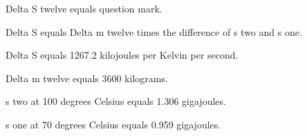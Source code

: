 Delta S twelve equals question mark.

Delta S equals Delta m twelve times the difference of s two and s one.

Delta S equals 1267.2 kilojoules per Kelvin per second.

Delta m twelve equals 3600 kilograms.

s two at 100 degrees Celsius equals 1.306 gigajoules.

s one at 70 degrees Celsius equals 0.959 gigajoules.